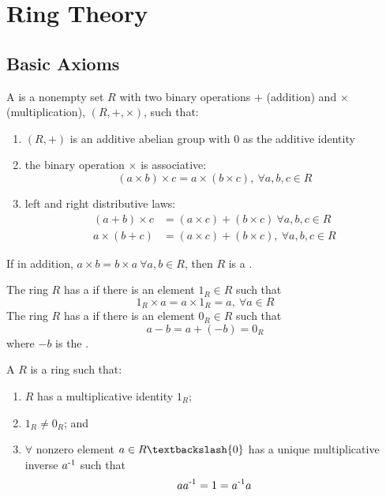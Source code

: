 \section{Ring Theory}

\subsection{Basic Axioms}

\begin{definition}
A  is a nonempty set $ R $ with two binary operations $ + $ (addition) and $ \times $ (multiplication), $ (R, +, \times) $, such that:
\begin{enumerate}[label=(\roman*)]
\item $(R, +)$ is an additive abelian group with $0$ as the additive identity
\item the binary operation $\times$ is associative: 
\begin{equation}
(a \times b) \times c = a \times (b \times c), \ \forall a, b, c \in R
\nonumber
\end{equation}
\item left and right distributive laws: 
\begin{align}
(a+b) \times c &= (a \times c) + (b \times c) \ \forall a, b, c \in R \nonumber \\
a \times (b+c) &= (a \times c) + (b \times c), \ \forall a, b, c \in R \nonumber
\end{align}
\end{enumerate}
If in addition, $a \times b = b \times a \ \forall a, b \in R$, then $R$ is a .
\end{definition}


\begin{definition}
The ring $R$ has a  if there is an element $1_R \in R$ such that 
\begin{equation}
1_R \times a = a \times 1_R = a, \ \forall a \in R
\nonumber
\end{equation}
The ring $R$ has a  if there is an element $0_R \in R$ such that 
\begin{equation}
a-b = a+(-b) = 0_R
\nonumber
\end{equation}
where $-b$ is the .
\end{definition}


\begin{definition}
A  $R$ is a ring such that:
\begin{enumerate}[label=(\roman*)]
\item $R$ has a multiplicative identity $1_R$;
\item $1_R \neq 0_R$; and
\item $\forall$ nonzero element $a \in R \textbackslash \{0\}$ has a unique multiplicative inverse $a \textsuperscript{-1}$ such that
\begin{equation}
aa \textsuperscript{-1} = 1 = a \textsuperscript{-1} a
\nonumber
\end{equation}
\end{enumerate}
\end{definition}


